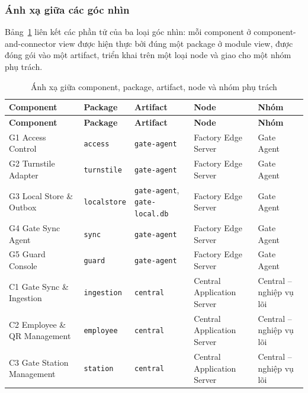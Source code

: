 \subsubsection{Ánh xạ giữa các góc nhìn}\label{sec:view-mapping}
Bảng~\ref{tab:view-mapping} liên kết các phần tử của ba loại góc nhìn: mỗi component ở component-and-connector view được hiện thực bởi đúng một package ở module view, được đóng gói vào một artifact, triển khai trên một loại node và giao cho một nhóm phụ trách.

\begingroup
\small
\renewcommand{\arraystretch}{1.3}
\begin{longtable}{|>{\raggedright\arraybackslash}p{4.1cm}|>{\raggedright\arraybackslash}p{2.4cm}|>{\raggedright\arraybackslash}p{2.3cm}|>{\raggedright\arraybackslash}p{3.0cm}|>{\raggedright\arraybackslash}p{3.0cm}|}
\caption{Ánh xạ giữa component, package, artifact, node và nhóm phụ trách}\label{tab:view-mapping}\\
\hline
\textbf{Component} & \textbf{Package} & \textbf{Artifact} & \textbf{Node} & \textbf{Nhóm} \\
\hline
\endfirsthead
\hline
\textbf{Component} & \textbf{Package} & \textbf{Artifact} & \textbf{Node} & \textbf{Nhóm} \\
\hline
\endhead
\hline
\endfoot
\endlastfoot
G1 Access Control & \texttt{access} & \texttt{gate-agent} & Factory Edge Server & Gate Agent \\
\hline
G2 Turnstile Adapter & \texttt{turnstile} & \texttt{gate-agent} & Factory Edge Server & Gate Agent \\
\hline
G3 Local Store \& Outbox & \texttt{localstore} & \texttt{gate-agent}, \texttt{gate-}\allowbreak\texttt{local.db} & Factory Edge Server & Gate Agent \\
\hline
G4 Gate Sync Agent & \texttt{sync} & \texttt{gate-agent} & Factory Edge Server & Gate Agent \\
\hline
G5 Guard Console & \texttt{guard} & \texttt{gate-agent} & Factory Edge Server & Gate Agent \\
\hline
C1 Gate Sync \& Ingestion & \texttt{ingestion} & \texttt{central} & Central Application Server & Central -- nghiệp vụ lõi \\
\hline
C2 Employee \& QR Management & \texttt{employee} & \texttt{central} & Central Application Server & Central -- nghiệp vụ lõi \\
\hline
C3 Gate Station Management & \texttt{station} & \texttt{central} & Central Application Server & Central -- nghiệp vụ lõi \\

\end{longtable}
